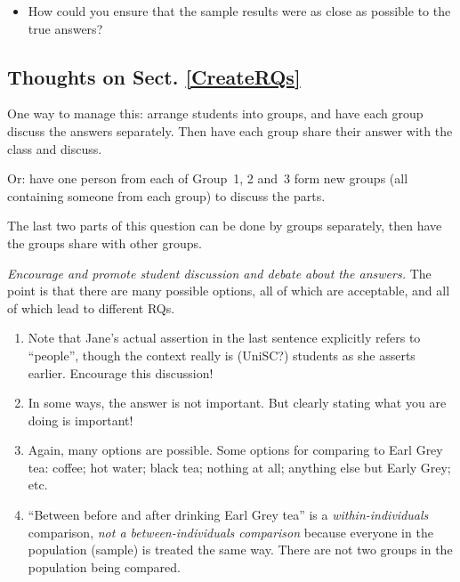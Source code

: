 \documentclass[
  11pt,
  a4paper,
  krantz2]{krantz}
\providecommand{\tightlist}{%
  \setlength{\itemsep}{0pt}\setlength{\parskip}{0pt}}
\begin{document}
\begin{itemize}
  \begin{itemize}
  \tightlist
  \item
    How close do they think the survey percentages are to the true percentage?
  \item
    Within \(1\)\%? \(5\)\% \(10\)\% of the true value?
  \item
    How many would we need in our sample to get a percentage to within \(1\)\% either side of the true percentage?
  \item
    What if (say) males were less likely to answer the survey than females?
  \item
    Does the voluntary-response aspect cause you to doubt the accuracy and precision of the answers?
  \end{itemize}
\item
  How could you ensure that the sample results were as close as possible to the true answers?
\end{itemize}

\subsection{Thoughts on Sect. \ref{CreateRQs}}\label{thoughts-on-sect.-refcreaterqs}

One way to manage this: arrange students into groups, and have each group discuss the answers separately.
Then have each group share their answer with the class and discuss.

Or: have one person from each of Group~1, 2 and~3 form new groups (all containing someone from each group) to discuss the parts.

The last two parts of this question can be done by groups separately, then have the groups share with other groups.

\emph{Encourage and promote student discussion and debate about the answers.}
The point is that there are many possible options, all of which are acceptable, and all of which lead to different RQs.

\begin{enumerate}
\def\labelenumi{\arabic{enumi}.}
\tightlist
\item
  Note that Jane's actual assertion in the last sentence explicitly refers to ``people'', though the context really is (UniSC?) students as she asserts earlier.
  Encourage this discussion!
\item
  In some ways, the answer is not important.
  But clearly stating what you are doing is important!
\item
  Again, many options are possible.
  Some options for comparing to Earl Grey tea:
  coffee; hot water; black tea; nothing at all; anything else but Early Grey; etc.
\item
  ``Between before and after drinking Earl Grey tea'' is a \emph{within-individuals} comparison, \emph{not a between-individuals comparison} because everyone in the population (sample) is treated the same way.
  There are not two groups in the population being compared.
\end{enumerate}
\end{document}
